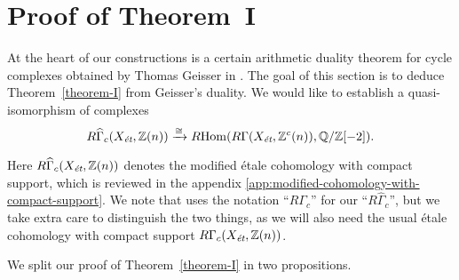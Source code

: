 \documentclass{article}
\numberwithin{equation}{section}
\begin{document}

\section{Proof of Theorem~I}
\label{sec:arithmetic-duality-theorem}

At the heart of our constructions is a certain arithmetic duality theorem for
cycle complexes obtained by Thomas Geisser in \cite{Geisser-2010}. The goal of
this section is to deduce Theorem~\ref{theorem-I} from Geisser's duality.
We would like to establish a quasi-isomorphism of complexes
\[ R\widehat{\Gamma}_c (X_\et, \ZZ (n)) \xrightarrow{\cong}
\RHom (R\Gamma (X_\et, \ZZ^c (n)), \QQ/\ZZ [-2]). \]

Here $R\widehat{\Gamma}_c (X_\et, \ZZ (n))$ denotes the modified étale
cohomology with compact support, which is reviewed in the appendix
\ref{app:modified-cohomology-with-compact-support}. We note that
\cite{Geisser-2010} uses the notation ``$R\Gamma_c$'' for our
``$R\widehat{\Gamma}_c$'', but we take extra care to distinguish the two things,
as we will also need the usual étale cohomology with compact support
$R\Gamma_c (X_\et, \ZZ (n))$.

We split our proof of Theorem~\ref{theorem-I} in two propositions.
\end{document}
